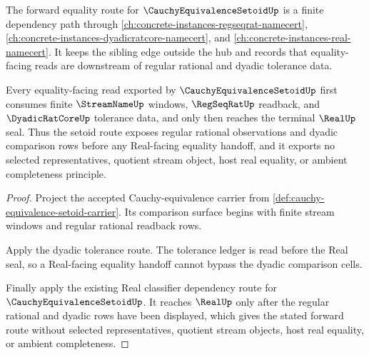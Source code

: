 The forward equality route for $\CauchyEquivalenceSetoidUp$ is a finite dependency path through \autoref{ch:concrete-instances-regseqrat-namecert}, \autoref{ch:concrete-instances-dyadicratcore-namecert}, and \autoref{ch:concrete-instances-real-namecert}. It keeps the sibling edge outside the hub and records that equality-facing reads are downstream of regular rational and dyadic tolerance data.

\begin{theorem}
\label{thm:cauchy-equivalence-setoid-regseqrat-real-forward}
Every equality-facing read exported by $\CauchyEquivalenceSetoidUp$ first consumes finite $\StreamNameUp$ windows, $\RegSeqRatUp$ readback, and $\DyadicRatCoreUp$ tolerance data, and only then reaches the terminal $\RealUp$ seal. Thus the setoid route exposes regular rational observations and dyadic comparison rows before any Real-facing equality handoff, and it exports no selected representatives, quotient stream object, host real equality, or ambient completeness principle.
\end{theorem}
\begin{proof}
Project the accepted Cauchy-equivalence carrier from \autoref{def:cauchy-equivalence-setoid-carrier}. Its comparison surface begins with finite stream windows and regular rational readback rows.

Apply the dyadic tolerance route. The tolerance ledger is read before the Real seal, so a Real-facing equality handoff cannot bypass the dyadic comparison cells.

Finally apply the existing Real classifier dependency route for $\CauchyEquivalenceSetoidUp$. It reaches $\RealUp$ only after the regular rational and dyadic rows have been displayed, which gives the stated forward route without selected representatives, quotient stream objects, host real equality, or ambient completeness.
\end{proof}
